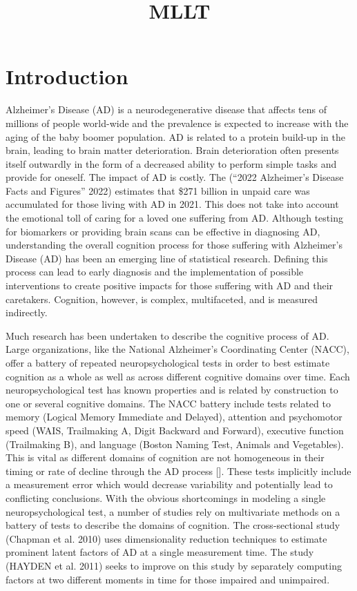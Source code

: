 \documentclass[
]{article}
\title{MLLT}
\author{}
\date{\vspace{-2.5em}}
\begin{document}
\maketitle

\hypertarget{introduction}{%
\section{Introduction}\label{introduction}}

Alzheimer's Disease (AD) is a neurodegenerative disease that affects tens of millions of people world-wide and the prevalence is expected to increase with the aging of the baby boomer population. AD is related to a protein build-up in the brain, leading to brain matter deterioration. Brain deterioration often presents itself outwardly in the form of a decreased ability to perform simple tasks and provide for oneself. The impact of AD is costly. The ({``2022 Alzheimer's Disease Facts and Figures''} 2022) estimates that \$271 billion in unpaid care was accumulated for those living with AD in 2021. This does not take into account the emotional toll of caring for a loved one suffering from AD. Although testing for biomarkers or providing brain scans can be effective in diagnosing AD, understanding the overall cognition process for those suffering with Alzheimer's Disease (AD) has been an emerging line of statistical research. Defining this process can lead to early diagnosis and the implementation of possible interventions to create positive impacts for those suffering with AD and their caretakers. Cognition, however, is complex, multifaceted, and is measured indirectly.

Much research has been undertaken to describe the cognitive process of AD. Large organizations, like the National Alzheimer's Coordinating Center (NACC), offer a battery of repeated neuropsychological tests in order to best estimate cognition as a whole as well as across different cognitive domains over time. Each neuropsychological test has known properties and is related by construction to one or several cognitive domains. The NACC battery include tests related to memory (Logical Memory Immediate and Delayed), attention and psychomotor speed (WAIS, Trailmaking A, Digit Backward and Forward), executive function (Trailmaking B), and language (Boston Naming Test, Animals and Vegetables). This is vital as different domains of cognition are not homogeneous in their timing or rate of decline through the AD process {[}{]}. These tests implicitly include a measurement error which would decrease variability and potentially lead to conflicting conclusions. With the obvious shortcomings in modeling a single neuropsychological test, a number of studies rely on multivariate methods on a battery of tests to describe the domains of cognition. The cross-sectional study (Chapman et al. 2010) uses dimensionality reduction techniques to estimate prominent latent factors of AD at a single measurement time. The study (HAYDEN et al. 2011) seeks to improve on this study by separately computing factors at two different moments in time for those impaired and unimpaired.
\end{document}

